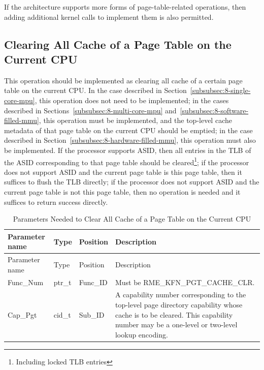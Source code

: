 If the architecture supports more forms of page-table-related operations, then adding additional kernel calls to implement them is also permitted.

\subsection{Clearing All Cache of a Page Table on the Current CPU}\label{subsec:8-clear-all-page-table-cache}

This operation should be implemented as clearing all cache of a certain page table on the current CPU. In the case described in Section~\ref{subsubsec:8-single-core-mpu}, this operation does not need to be implemented; in the cases described in Sections~\ref{subsubsec:8-multi-core-mpu} and~\ref{subsubsec:8-software-filled-mmu}, this operation must be implemented, and the top-level cache metadata of that page table on the current CPU should be emptied; in the case described in Section~\ref{subsubsec:8-hardware-filled-mmu}, this operation must also be implemented. If the processor supports ASID, then all entries in the TLB of the ASID corresponding to that page table should be cleared\footnote{Including locked TLB entries}; if the processor does not support ASID and the current page table is this page table, then it suffices to flush the TLB directly; if the processor does not support ASID and the current page table is not this page table, then no operation is needed and it suffices to return success directly.

\begin{xltabular}{\textwidth}{@{}>{\hsize\raggedright\arraybackslash}X>{\hsize\raggedright\arraybackslash}X>{\hsize\raggedright\arraybackslash}X>{\hsize\raggedright\arraybackslash}X@{}}
\caption{Parameters Needed to Clear All Cache of a Page Table on the Current CPU}\label{tab:8-5-clear-all-page-table-cache-parameters}\\
\toprule
Parameter name & Type & Position & Description\tabularnewline
\endfirsthead
\toprule
Parameter name & Type & Position & Description\tabularnewline
\midrule
\endhead
\bottomrule
\endlastfoot
Func\_Num & ptr\_t & Func\_ID & Must be RME\_KFN\_PGT\_CACHE\_CLR.\tabularnewline
Cap\_Pgt & cid\_t & Sub\_ID &
A capability number corresponding to the top-level page directory capability whose cache is to be cleared. This capability number may be a one-level or two-level lookup encoding.\tabularnewline
\end{xltabular}
\nopagebreak[4]

